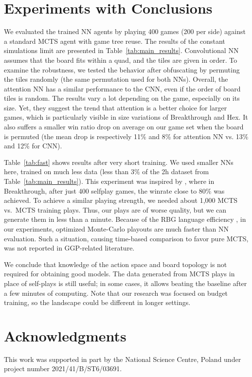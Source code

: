 \documentclass[letterpaper]{article} %
\begin{document}
\section{Experiments with Conclusions}

We evaluated the trained NN agents by playing 400 games (200 per side) against a standard MCTS agent with game tree reuse. The results of the constant simulations limit are presented in Table~\ref{tab:main_results}.
Convolutional NN assumes that the board fits within a quad, and the tiles are given in order.
To examine the robustness, we tested the behavior after obfuscating by permuting the tiles randomly (the same permutation used for both NNs).
Overall, the attention NN has a similar performance to the CNN, even if the order of board tiles is random. The results vary a lot depending on the game, especially on its size.
Yet, they suggest the trend that attention is a better choice for larger games, which is particularly visible in size variations of Breakthrough and Hex.
It also suffers a smaller win ratio drop on average on our game set when the board is permuted (the mean drop is respectively 11\% and 8\% for attention NN vs. 13\% and 12\% for CNN).

Table~\ref{tab:fast} shows results after very short training.
We used smaller NNs here, trained on much less data (less than $3\%$ of the 2h dataset from Table~\ref{tab:main_results}).
This experiment was inspired by \cite{ThielscherAAAI20}, where in Breakthrough, after just 400 selfplay games, the winrate close to 80\% was achieved.
To achieve a similar playing strength, we needed about 1,000 MCTS vs.\ MCTS training plays. Thus, our plays are of worse quality, but we can generate them in less than a minute. 
Because of the RBG language efficiency \cite{Kowalski2020EfficientReasoning}, in our experiments, optimized Monte-Carlo playouts are much faster than NN evaluation. Such a situation, causing time-based comparison to favor pure MCTS, was not reported in GGP-related literature.

We conclude that knowledge of the action space and board topology is not required for obtaining good models.
The data generated from MCTS plays in place of self-plays is still useful; in some cases, it allows beating the baseline after a few minutes of computing.
Note that our research was focused on budget training, so the landscape could be different in longer settings.




\section{Acknowledgments}
This work was supported in part by the National Science Centre, Poland under project number 2021/41/B/ST6/03691.


\end{document}
